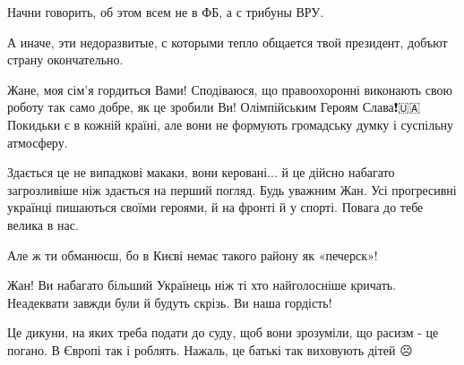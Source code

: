 \begin{itemize}
Начни говорить, об этом всем не в ФБ, а с трибуны ВРУ.

А иначе, эти недоразвитые, с которыми тепло общается твой президент, добъют
страну окончательно.


 

Жане, моя сім'я гордиться Вами! Сподіваюся, що правоохоронні виконають свою
роботу так само добре, як це зробили Ви! Олімпійським Героям Слава❗️🇺🇦
Покидьки є в кожній країні, але вони не формують громадську думку і суспільну
атмосферу.


 

Здається це не випадкові макаки, вони керовані... й це дійсно набагато
загрозливіше ніж здається на перший погляд. Будь уважним Жан. Усі прогресивні
українці пишаються своїми героями, й на фронті й у спорті. Повага до тебе
велика в нас.

 
Але ж ти обманюєш, бо в Києві немає такого району як «печерск»!


 

Жан! Ви набагато більший Українець ніж ті хто найголосніше кричать. Неадеквати
завжди були й будуть скрізь. Ви наша гордість!


 

Це дикуни, на яких треба подати до суду, щоб вони зрозуміли, що расизм - це
погано. В Європі так і роблять. Нажаль, це батькі так виховують дітей ☹️



\end{itemize}

